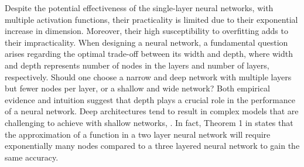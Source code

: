 

Despite the potential effectiveness of the single-layer neural networks, with multiple activation functions, their practicality is limited due to their exponential increase in dimension. Moreover, their high susceptibility to overfitting adds to their impracticality. When designing a neural network, a fundamental question arises regarding the optimal trade-off between its width and depth, where width and depth represents number of nodes in the layers and number of layers, respectively. Should one choose a narrow and deep network with multiple layers but fewer nodes per layer, or a shallow and wide network? Both empirical evidence and intuition suggest that depth plays a crucial role in the performance of a neural network. Deep architectures tend to result in complex models that are challenging to achieve with shallow networks, \citep{REOS}. In fact, Theorem 1 in \citep{REOS} states that the approximation of a function in a two layer neural network will require exponentially many nodes compared to a three layered neural network to gain the same accuracy. %

